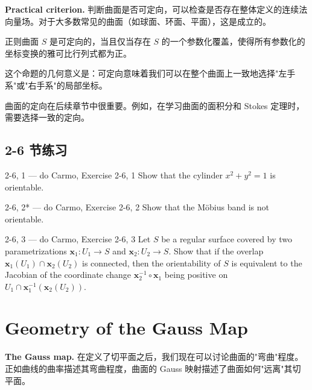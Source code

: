 \textbf{Practical criterion.} 判断曲面是否可定向，可以检查是否存在整体定义的连续法向量场。对于大多数常见的曲面（如球面、环面、平面），这是成立的。

\begin{Proposition}[可定向的等价条件]\label{prop:orientable-equivalent}
正则曲面 $S$ 是可定向的，当且仅当存在 $S$ 的一个参数化覆盖，使得所有参数化的坐标变换的雅可比行列式都为正。
\end{Proposition}

这个命题的几何意义是：可定向意味着我们可以在整个曲面上一致地选择"左手系"或"右手系"的局部坐标。

\begin{Remark}
曲面的定向在后续章节中很重要。例如，在学习曲面的面积分和 Stokes 定理时，需要选择一致的定向。
\end{Remark}

\subsection*{2-6 节练习}

\begin{exercise}{2-6, 1 — do Carmo, Exercise 2-6, 1}
Show that the cylinder $x^2 + y^2 = 1$ is orientable.
\end{exercise}

\begin{exercise}{2-6, 2* — do Carmo, Exercise 2-6, 2}
Show that the Möbius band is not orientable.
\end{exercise}

\begin{exercise}{2-6, 3 — do Carmo, Exercise 2-6, 3}
Let $S$ be a regular surface covered by two parametrizations $\mathbf{x}_1: U_1 \to S$ and $\mathbf{x}_2: U_2 \to S$. Show that if the overlap $\mathbf{x}_1(U_1) \cap \mathbf{x}_2(U_2)$ is connected, then the orientability of $S$ is equivalent to the Jacobian of the coordinate change $\mathbf{x}_2^{-1} \circ \mathbf{x}_1$ being positive on $U_1 \cap \mathbf{x}_1^{-1}(\mathbf{x}_2(U_2))$.
\end{exercise}

\section{Geometry of the Gauss Map}\label{sec:gauss-map}

\textbf{The Gauss map.} 在定义了切平面之后，我们现在可以讨论曲面的"弯曲"程度。正如曲线的曲率描述其弯曲程度，曲面的 Gauss 映射描述了曲面如何"远离"其切平面。

